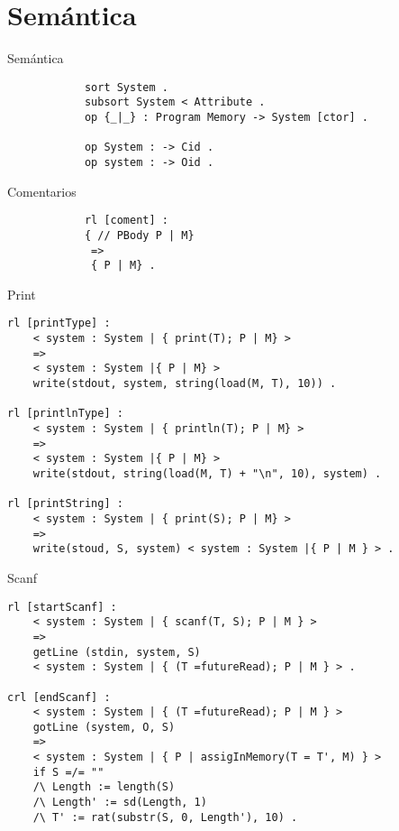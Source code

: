 \documentclass{beamer}
\begin{document}
    \section{Semántica}
    \begin{frame}[fragile]{Semántica}
        \begin{verbatim}  
            sort System .
            subsort System < Attribute .
            op {_|_} : Program Memory -> System [ctor] .

            op System : -> Cid . 
            op system : -> Oid . 
        \end{verbatim}
    \end{frame}

    \begin{frame}[fragile]{Comentarios}
        \begin{verbatim}  
            rl [coment] :
            { // PBody P | M}
             =>
             { P | M} .
        \end{verbatim}
    \end{frame}

    \begin{frame}[fragile]{Print}
        \begin{verbatim}  
rl [printType] :
    < system : System | { print(T); P | M} >
    => 
    < system : System |{ P | M} > 
    write(stdout, system, string(load(M, T), 10)) .

rl [printlnType] :
    < system : System | { println(T); P | M} >
    => 
    < system : System |{ P | M} > 
    write(stdout, string(load(M, T) + "\n", 10), system) .

rl [printString] :
    < system : System | { print(S); P | M} >
    => 
    write(stoud, S, system) < system : System |{ P | M } > .
        \end{verbatim}
    \end{frame}

    \begin{frame}[fragile]{Scanf}
        \begin{verbatim}  
rl [startScanf] :
    < system : System | { scanf(T, S); P | M } >
    =>
    getLine (stdin, system, S) 
    < system : System | { (T =futureRead); P | M } > .
    
crl [endScanf] :
    < system : System | { (T =futureRead); P | M } > 
    gotLine (system, O, S)
    =>
    < system : System | { P | assigInMemory(T = T', M) } > 
    if S =/= "" 
    /\ Length := length(S)
    /\ Length' := sd(Length, 1)
    /\ T' := rat(substr(S, 0, Length'), 10) .
        \end{verbatim}
    \end{frame}
\end{document}
